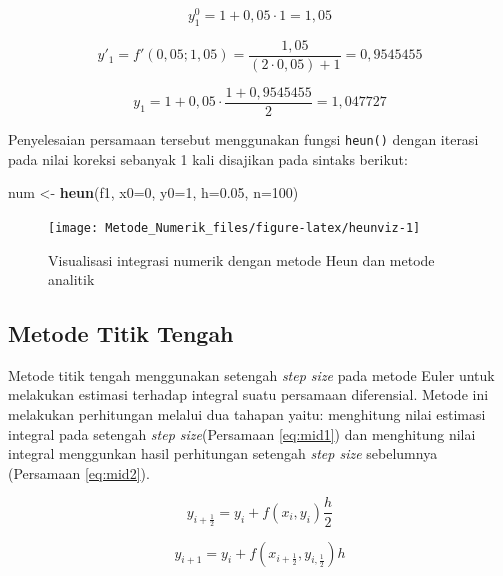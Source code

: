 \documentclass[]{book}
\newenvironment{Shaded}{\begin{snugshade}}{\end{snugshade}}
\newcommand{\DataTypeTok}[1]{\textcolor[rgb]{0.13,0.29,0.53}{#1}}
\newcommand{\DecValTok}[1]{\textcolor[rgb]{0.00,0.00,0.81}{#1}}
\newcommand{\FloatTok}[1]{\textcolor[rgb]{0.00,0.00,0.81}{#1}}
\newcommand{\KeywordTok}[1]{\textcolor[rgb]{0.13,0.29,0.53}{\textbf{#1}}}
\newcommand{\NormalTok}[1]{#1}
\newcommand{\StringTok}[1]{\textcolor[rgb]{0.31,0.60,0.02}{#1}}
\theoremstyle{definition}
\theoremstyle{definition}
\theoremstyle{definition}
\theoremstyle{remark}
\begin{document}
\[
y_{1}^0=1+0,05\cdot1=1,05
\]

\[
y'_1=f'\left(0,05;1,05\right)=\frac{1,05}{\left(2\cdot 0,05\right)+1}=0,9545455
\]

\[
y_1=1+0,05\cdot\frac{1+0,9545455}{2}=1,047727
\]

Penyelesaian persamaan tersebut menggunakan fungsi \texttt{heun()} dengan iterasi pada nilai koreksi sebanyak 1 kali disajikan pada sintaks berikut:

\begin{Shaded}
\begin{Highlighting}[]
\NormalTok{num <-}\StringTok{ }\KeywordTok{heun}\NormalTok{(f1, }\DataTypeTok{x0=}\DecValTok{0}\NormalTok{, }\DataTypeTok{y0=}\DecValTok{1}\NormalTok{, }\DataTypeTok{h=}\FloatTok{0.05}\NormalTok{, }\DataTypeTok{n=}\DecValTok{100}\NormalTok{)}
\end{Highlighting}
\end{Shaded}

\begin{figure}

{\centering \texttt{[image: Metode\_Numerik\_files/figure-latex/heunviz-1]} 

}

\caption{Visualisasi integrasi numerik dengan metode Heun dan metode analitik}\label{fig:heunviz}
\end{figure}

\hypertarget{midpt}{%
\subsection{Metode Titik Tengah}\label{midpt}}

Metode titik tengah menggunakan setengah \emph{step size} pada metode Euler untuk melakukan estimasi terhadap integral suatu persamaan diferensial. Metode ini melakukan perhitungan melalui dua tahapan yaitu: menghitung nilai estimasi integral pada setengah \emph{step size}(Persamaan \eqref{eq:mid1}) dan menghitung nilai integral menggunkan hasil perhitungan setengah \emph{step size} sebelumnya (Persamaan \eqref{eq:mid2}).

\begin{equation}
y_{i+\frac{1}{2}}=y_i+f\left(x_i,y_i\right)\frac{h}{2}
  \label{eq:mid1}
\end{equation}

\begin{equation}
y_{i+1}=y_i+f\left(x_{i+\frac{1}{2}},y_{i,\frac{1}{2}}\right)h
  \label{eq:mid2}
\end{equation}
\end{document}
